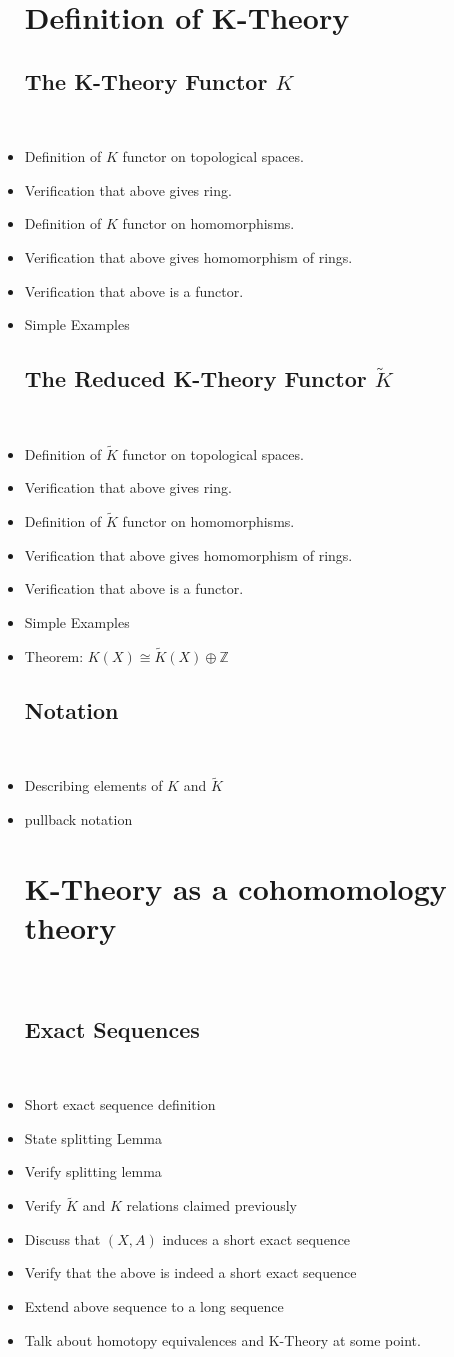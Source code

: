 \documentclass[12]{amsart}
\newcommand{\iso}{\cong} %
\newcommand{\KR}{\widetilde{K}}
\newcommand{\Z}{\mathbb{Z}}
\newcommand{\op}{\oplus}
\newcommand{\itemc}{\item[\checkmark]}
\newcommand{\itemo}{\item[$\circ$]}
\begin{document}
\begin{itemize}
\section{Definition of K-Theory} %
\subsection{The K-Theory Functor $K$}~
    \itemc Definition of $K$ functor on topological spaces.
    \itemc Verification that above gives ring.
    \itemc Definition of $K$ functor on homomorphisms.
    \itemc Verification that above gives homomorphism of rings.
    \itemc Verification that above is a functor.
    \item Simple Examples
\subsection{The Reduced K-Theory Functor $\KR$}~
    \item Definition of $\KR$ functor on topological spaces.
    \item Verification that above gives ring.
    \item Definition of $\KR$ functor on homomorphisms.
    \item Verification that above gives homomorphism of rings.
    \item Verification that above is a functor.
    \item Simple Examples
	\item Theorem: $K(X) \iso \KR(X) \op \Z$
\subsection{Notation}~
    \item Describing elements of $K$ and $\KR$
    \item pullback notation


\section{K-Theory as a cohomomology theory}~
\subsection{Exact Sequences}~
    \item Short exact sequence definition
    \item State splitting Lemma
    \itemo Verify splitting lemma
    \item Verify $\KR$ and $K$ relations claimed previously
    \item Discuss that $(X,A)$ induces a short exact sequence
    \item Verify that the above is indeed a short exact sequence
    \item Extend above sequence to a long sequence
    \item Talk about homotopy equivalences and K-Theory at some point.


\end{itemize}
\end{document}
